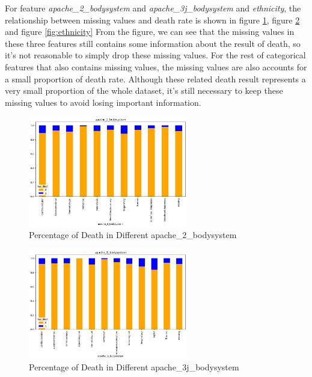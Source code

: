 \documentclass[a4paper, oneside, final, 12pt]{scrartcl} %
\begin{document}
For feature \emph{apache\_2\_bodysystem} and \emph{apache\_3j\_bodysystem} and \emph{ethnicity},
the relationship between missing values and death rate is shown in 
figure \ref{fig:apache_2}, figure \ref{fig:apache_3j} and figure \ref{fig:ethnicity}
From the figure, we can see that the missing values 
in these three features still contains some information about the result of death,
so it's not reasonable to simply drop these missing values.
For the rest of categorical features that also contains missing values,
the missing values are also accounts for a small proportion of death rate.
Although these related death result represents a very small proportion of the whole dataset,
it's still necessary to keep these missing values to avoid losing important information.


\begin{figure}[ht]
  \centering
  \includegraphics[width=0.62\textwidth]{"./image/dataset/apache_2_dis.png"}
  \caption{Percentage of Death in Different apache\_2\_bodysystem}
  \label{fig:apache_2}
\end{figure}

\begin{figure}[ht]
  \centering
  \includegraphics[width=0.62\textwidth]{"./image/dataset/apache_3j_dis.png"}
  \caption{Percentage of Death in Different apache\_3j\_bodysystem}
  \label{fig:apache_3j}
\end{figure}
\end{document}
